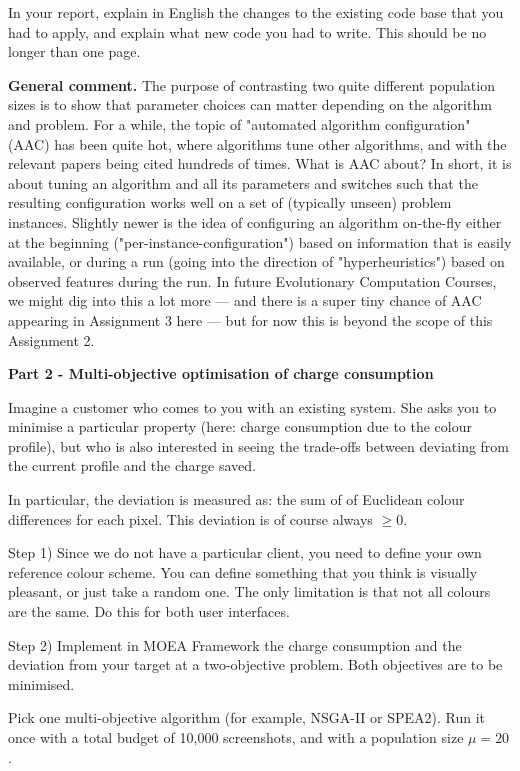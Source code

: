\documentclass{pracs}
\begin{document}
In your report, explain in English the changes to the existing code base that you had to apply, and explain what new code you had to write. This should be no longer than one page.

\textbf{General comment.} The purpose of contrasting two quite different population sizes is to show that parameter choices can matter depending on the algorithm and problem. For a while, the topic of "automated algorithm configuration" (AAC) has been quite hot, where algorithms tune other algorithms, and with the relevant papers being cited hundreds of times. What is AAC about? In short, it is about tuning an algorithm and all its parameters and switches such that the resulting configuration works well on a set of (typically unseen) problem instances.
Slightly newer is the idea of configuring an algorithm on-the-fly either at the beginning ("per-instance-configuration") based on information that is easily available, or during a run (going into the direction of "hyperheuristics") based on observed features during the run.
In future Evolutionary Computation Courses, we might dig into this a lot more --- and there is a super tiny chance of AAC appearing in Assignment 3 here --- but for now this is beyond the scope of this Assignment 2.

\noindent\textbf{Part 2 - Multi-objective optimisation of charge consumption}

Imagine a customer who comes to you with an existing system. She asks you to minimise a particular property (here: charge consumption due to the colour profile), but who is also interested in seeing the trade-offs between deviating from the current profile and the charge saved.

In particular, the deviation is measured as: the sum of of Euclidean colour differences for each pixel. This deviation is of course always $\geq0$.

Step 1) Since we do not have a particular client, you need to define your own reference colour scheme. You can define something that you think is visually pleasant, or just take a random one. The only limitation is that not all colours are the same. Do this for both user interfaces.

Step 2) Implement in MOEA Framework the charge consumption and the deviation from your target at a two-objective problem. Both objectives are to be minimised.

Pick one multi-objective algorithm (for example, NSGA-II or SPEA2). Run it once with a total budget of 10,000 screenshots, and with a population size $\mu=20$.
\end{document}
